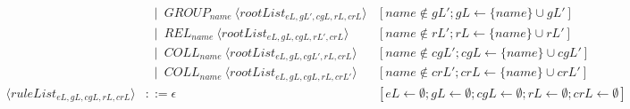 \begin{landscape}
\begin{adjustbox}{max width=\linewidth,max height=.95\textheight,valign=c}
{\begin{align}
                                                            & ~~ \mid ~ GROUP_{name} ~ \langle rootList_{eL,gL',cgL,rL,crL} \rangle                                                                                                                                                                                                                                                                                                                        & [name \notin gL'; gL \gets \{name\} \cup gL']                                                                     \label{meta:rootList:3} \\
                                                            & ~~ \mid ~ REL_{name}  ~ \langle rootList_{eL,gL,cgL,rL',crL} \rangle                                                                                                                                                                                                                                                                                                                         & [name \notin rL'; rL \gets \{name\} \cup rL']                                                                     \label{meta:rootList:4} \\
                                                            & ~~ \mid ~ COLL_{name} ~ \langle rootList_{eL,gL,cgL',rL,crL} \rangle                                                                                                                                                                                                                                                                                                                         & [name \notin cgL'; cgL \gets \{name\} \cup cgL']                                                                  \label{meta:rootList:5} \\
                                                            & ~~ \mid ~ COLL_{name} ~ \langle rootList_{eL,gL,cgL,rL,crL'} \rangle                                                                                                                                                                                                                                                                                                                         & [name \notin crL'; crL \gets \{name\} \cup crL']                                                                  \label{meta:rootList:6} \\[1em]
                \langle ruleList_{eL,gL,cgL,rL,crL} \rangle & ::= \epsilon                                                                                                                                                                                                                                                                                                                                                                                 & [eL \gets \emptyset; gL \gets \emptyset; cgL \gets \emptyset; rL \gets \emptyset; crL \gets \emptyset]            \label{meta:ruleList:1} \\

\end{align}}
\end{adjustbox}
\end{landscape}
